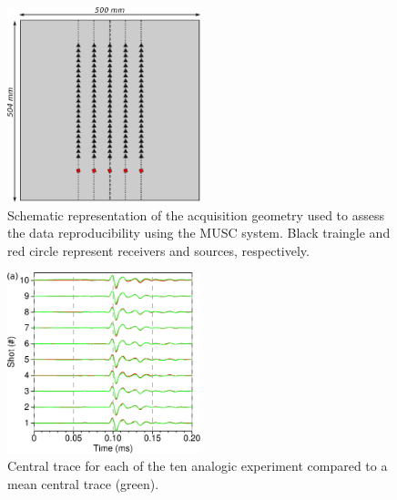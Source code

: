 \documentclass[manuscript,revised]{geophysics}
\begin{document}

\begin{figure}[!h]
	\centering
	\includegraphics[width=0.5\textwidth]{fig/reproducibility_acqui_principle.eps}
	\caption{Schematic representation of the acquisition geometry used to assess the data reproducibility using the MUSC system. Black traingle and red circle represent receivers and sources, respectively.}
	\label{reproducibility_acqui_principle}
\end{figure}

\begin{figure}[!h]
	\centering
	\includegraphics[width=0.5\textwidth]{fig/musc_F50_CT.eps}
	\caption{Central trace for each of the ten analogic experiment compared to a mean central trace (green).}
	\label{panel_central_traces_cc}
\end{figure}
\end{document}
